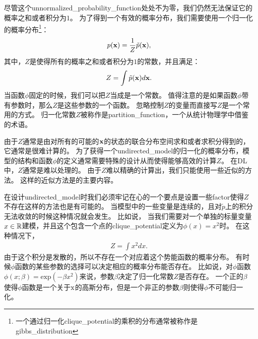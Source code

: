 \subsection{}
\label{sec:the_partition_function}



尽管这个\gls{unnormalized_probability_function}处处不为零，我们仍然无法保证它的概率之和或者积分为$1$。
为了得到一个有效的概率分布，我们需要使用一个归一化的概率分布\footnote{一个通过归一化\gls{clique_potential}的乘积的分布通常被称作是\gls{gibbs_distribution}}：
\begin{align}
p(\mathbf{x}) = \frac{1}{Z}\tilde{p}(\mathbf{x}),
\end{align}
其中，$Z$是使得所有的概率之和或者积分为$1$的常数，并且满足：
\begin{align}
Z = \int \tilde{p}(\mathbf{x})d\mathbf{x}.
\end{align}
当函数$\phi$固定的时候，我们可以把$Z$当成是一个常数。
值得注意的是如果函数$\phi$带有参数时，那么$Z$是这些参数的一个函数。
忽略控制$Z$的变量而直接写$Z$是一个常用的方式。
归一化常数$Z$被称作是\gls{partition_function}，一个从统计物理学中借鉴的术语。


由于$Z$通常是由对所有的可能的$\mathbf{x}$的状态的联合分布空间求和或者求积分得到的，它通常是很难计算的。
为了获得一个\gls{undirected_model}的归一化的概率分布，模型的结构和函数$\phi$的定义通常需要特殊的设计从而使得能够高效的计算$Z$。
在\gls{DL}中，$Z$通常是难以处理的。
由于$Z$难以精确的计算出，我们只能使用一些近似的方法。
这样的近似方法是的主要内容。



在设计\gls{undirected_model}时我们必须牢记在心的一个要点是设置一些\gls{factor}使得$Z$不存在这样的方法也是有可能的。
当模型中的一些变量是连续的，且对$\tilde{p}$上的积分无法收敛的时候这种情况就会发生。
比如说， 当我们需要对一个单独的标量变量$x\in\mathbb{R}$建模，并且这个包含一个点的\gls{clique_potential}定义为$\phi(x) = x^2$时。
在这种情况下，
\begin{align}
Z = \int x^2 dx.
\end{align}
由于这个积分是发散的，所以不存在一个对应着这个势能函数的概率分布。
有时候$\phi$函数的某些参数的选择可以决定相应的概率分布能否存在。
比如说，对$\phi$函数$\phi(x;\beta) = \text{exp}(-\beta x^2)$来说，参数$\beta$决定了归一化常数$Z$是否存在。
一个正的$\beta$使得$\phi$函数是一个关于$\mathrm{x}$的高斯分布，但是一个非正的参数$\beta$则使得$\phi$不可能归一化。


